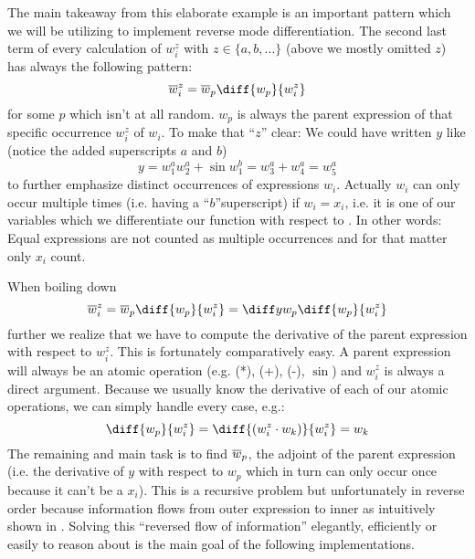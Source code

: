 The main takeaway from this elaborate \todowording example is an important pattern which we will be utilizing to implement reverse mode differentiation. The second last term of every calculation of $w_i^z$ with $z \in \{a, b, ...\}$ (above we mostly omitted $z$)  has always the following pattern:
\newcommand{\defoverwiz}{\overw{i}^z = \overw{p}\diff{w_p}{w_i^z}}
\[ \defoverwiz \]
for some $p$ which isn't at all random. $w_p$ is always the parent expression of that specific occurrence $w_i^z$ of $w_i$. To make that ``$z$'' clear: We could have written $y$ like (notice the added superscripts $a$ and $b$)
\[ y = w_1^a w_2^a + \sin{w_1^b} = w_3^a + w_4^a = w_5^a \]
to further emphasize distinct occurrences of expressions $w_i$. Actually $w_i$ can only occur multiple times (i.e. having a ``$b$''superscript) if $w_i = x_i$, i.e. it is one of our variables which we differentiate our function with respect to \todogrammar. In other words: Equal expressions are not counted as multiple occurrences and for that matter only $x_i$ count.

When boiling down
\[ \overw{i}^z = \overw{p}\diff{w_p}{w_i^z} = \diffyw{p}\diff{w_p}{w_i^z} \]
further we realize that we have to compute the derivative of the parent expression with respect to $w_i^z$. This is fortunately comparatively easy. A parent expression will always be an atomic operation (e.g. (*), (+), (-), $\sin$) and $w_i^z$ is always a direct argument. Because we usually know the derivative of each of our atomic operations, we can simply handle every case, e.g.:
\[ \diff{w_p}{w_i^z} = \diff{(w_i^z \cdot w_k)}{w_i^z} = w_k \]
The remaining and main task is to find $\overline{w}_p$, \todopunctuation the adjoint of the parent expression (i.e. the derivative of $y$ with respect to $w_p$ which in turn can only occur once because it can't be a $x_i$). This is a recursive problem but unfortunately in reverse order because information flows from outer expression to inner  as intuitively shown in  . Solving this ``reversed flow of information'' elegantly, efficiently or easily to reason about is the main goal of the following implementations. 



